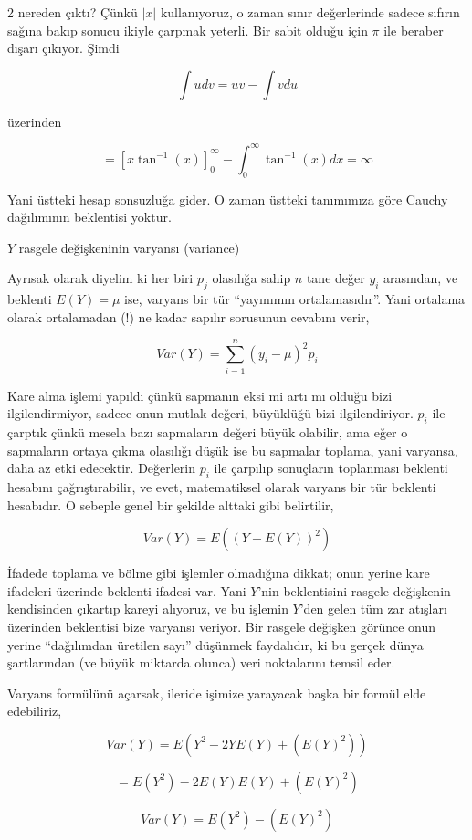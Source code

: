 \documentclass[12pt,fleqn]{article}\usepackage{../../common}
\begin{document}
2 nereden çıktı? Çünkü $|x|$ kullanıyoruz, o zaman sınır değerlerinde
sadece sıfırın sağına bakıp sonucu ikiyle çarpmak yeterli. Bir sabit olduğu
için $\pi$ ile beraber dışarı çıkıyor. Şimdi

$$ \int udv = uv - \int vdu $$

üzerinden

$$ = [x \tan ^{-1}(x) ] _{ 0}^{\infty} - \int _{ 0}^{\infty} \tan ^{-1}(x)
dx  = \infty$$

Yani üstteki hesap sonsuzluğa gider. O zaman üstteki tanımımıza göre Cauchy
dağılımının beklentisi yoktur. 

$Y$ rasgele değişkeninin varyansı (variance) 

Ayrısak olarak diyelim ki her biri $p_j$ olasılığa sahip $n$ tane değer
$y_i$ arasından, ve beklenti $E(Y) = \mu$ ise, varyans bir tür ``yayınımın
ortalamasıdır''. Yani ortalama olarak ortalamadan (!) ne kadar sapılır
sorusunun cevabını verir,

$$ Var(Y) = \sum _{i=1}^{n}(y_i-\mu)^2 p_i$$

Kare alma işlemi yapıldı çünkü sapmanın eksi mi artı mı olduğu bizi
ilgilendirmiyor, sadece onun mutlak değeri, büyüklüğü bizi
ilgilendiriyor. $p_i$ ile çarptık çünkü mesela bazı sapmaların değeri büyük
olabilir, ama eğer o sapmaların ortaya çıkma olasılığı düşük ise bu
sapmalar toplama, yani varyansa, daha az etki edecektir. Değerlerin $p_i$
ile çarpılıp sonuçların toplanması beklenti hesabını çağrıştırabilir, ve
evet, matematiksel olarak varyans bir tür beklenti hesabıdır. O sebeple
genel bir şekilde alttaki gibi belirtilir,

$$ Var(Y) = E((Y-E(Y))^2) $$

İfadede toplama ve bölme gibi işlemler olmadığına dikkat; onun yerine kare
ifadeleri üzerinde beklenti ifadesi var. Yani $Y$'nin beklentisini rasgele
değişkenin kendisinden çıkartıp kareyi alıyoruz, ve bu işlemin $Y$'den
gelen tüm zar atışları üzerinden beklentisi bize varyansı veriyor. Bir
rasgele değişken görünce onun yerine ``dağılımdan üretilen sayı'' düşünmek
faydalıdır, ki bu gerçek dünya şartlarından (ve büyük miktarda olunca) veri
noktalarını temsil eder. 

Varyans formülünü açarsak, ileride işimize yarayacak başka bir formül elde
edebiliriz, 

$$ Var(Y) = E( Y^2  - 2YE(Y) + (E(Y)^2) )$$

$$  = E(Y^2)  - 2E(Y)E(Y) + (E(Y)^2)$$

$$ Var(Y) = E(Y^2) - (E(Y)^2)$$
\end{document}
